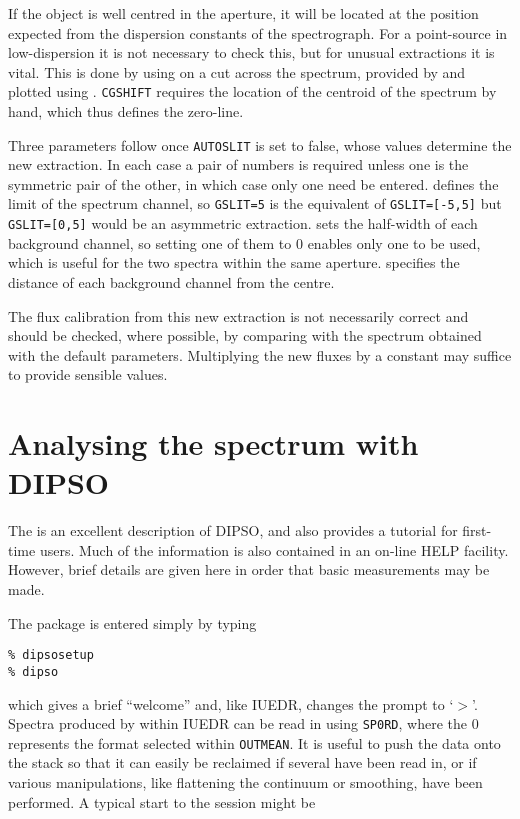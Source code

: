 If the object is well centred in the aperture, it will be located at the
position expected from the dispersion constants of the spectrograph.  For
a point-source in low-dispersion it is not necessary to check this, but for
unusual extractions it is vital.  This is done by using
 on a cut across the spectrum, provided
by  and plotted using
\@.
\verb+CGSHIFT+ requires the location of the centroid of the
spectrum by hand, which thus defines the zero-line.

Three parameters follow once \verb+AUTOSLIT+ is set to false, whose values
determine the new extraction.  In each case a pair of numbers is required
unless one is the symmetric pair of the other, in which case only one need be
entered.   defines the limit of the spectrum
channel, so \verb+GSLIT=5+ is the equivalent of \verb+GSLIT=[-5,5]+ but
\verb+GSLIT=[0,5]+
would be an asymmetric extraction.   sets the
half-width of each
background channel, so setting one of them to 0 enables only one to be
used, which is useful for the two spectra within the same aperture.
 specifies the distance of each background
channel from the centre.

The flux calibration from this new extraction is not necessarily correct and
should be checked, where possible, by comparing with the spectrum obtained
with the default parameters.  Multiplying the new fluxes by a constant may
suffice to provide sensible values.

\section{Analysing the spectrum with DIPSO}

The  is an excellent description of
DIPSO, and also
provides a tutorial for first-time users.  Much of the information is also
contained in an on-line HELP facility. However, brief details are given here
in order that basic measurements may be made.

The package is entered simply by typing

\begin{verbatim}
% dipsosetup
% dipso
\end{verbatim}

which gives a brief ``welcome'' and, like IUEDR, changes the prompt to `$>$'.
Spectra produced by  within IUEDR can be
read in using
\verb+SP0RD+, where the 0 represents the format selected within
\verb+OUTMEAN+\@.  It is useful to push the data onto the stack so that it can
easily be reclaimed if several have been read in, or if various manipulations,
like flattening the continuum or smoothing, have been performed.  A typical
start to the session might be

